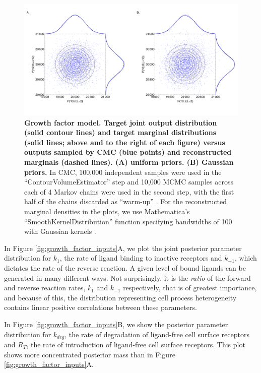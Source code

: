\begin{figure}[H]
	\centerline{\includegraphics[width=\textwidth]{../figures/growth_factor_outputs.pdf}}
	\caption{\textbf{Growth factor model. Target joint output distribution (solid contour lines) and target marginal distributions (solid lines; above and to the right of each figure) versus outputs sampled by CMC (blue points) and reconstructed marginals (dashed lines). (A) uniform priors. (B) Gaussian priors.} In CMC, 100,000 independent samples were used in the ``ContourVolumeEstimator'' step and 10,000 MCMC samples across each of 4 Markov chains were used in the second step, with the first half of the chains discarded as ``warm-up'' \cite{lambert2018Student}. For the reconstructed marginal densities in the plots, we use Mathematica's ``SmoothKernelDistribution'' function specifying bandwidths of 100 with Gaussian kernels \cite{mathematica}.}
	\label{fig:growth_factor_outputs}
\end{figure}


In Figure \ref{fig:growth_factor_inputs}A, we plot the joint posterior parameter distribution for $k_1$, the rate of ligand binding to inactive receptors and $k_{-1}$, which dictates the rate of the reverse reaction. A given level of bound ligands can be generated in many different ways. Not surprisingly, it is the \emph{ratio} of the forward and reverse reaction rates, $k_1$ and $k_{-1}$ respectively, that is of greatest importance, and because of this, the distribution representing cell process heterogeneity contains linear positive correlations between these parameters.


In Figure \ref{fig:growth_factor_inputs}B, we show the posterior parameter distribution for $k_{deg}$, the rate of degradation of ligand-free cell surface receptors and $R_T$, the rate of introduction of ligand-free cell surface receptors. This plot shows more concentrated posterior mass than in Figure \ref{fig:growth_factor_inputs}A.


